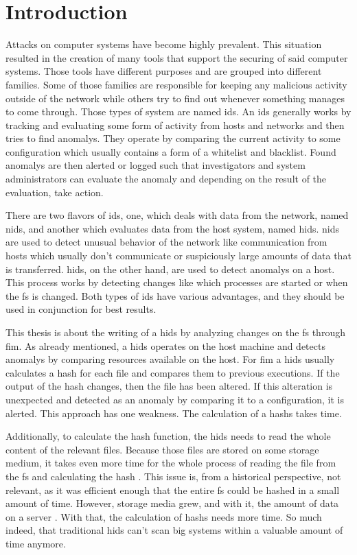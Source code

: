 \chapter{Introduction}

Attacks on computer systems have become highly prevalent. This situation resulted in the creation of many tools that support the securing of said computer systems. Those tools have different purposes and are grouped into different families. Some of those families are responsible for keeping any malicious activity outside of the network while others try to find out whenever something manages to come through. Those types of system are named \gls{ids}. An \gls{ids} generally works by tracking and evaluating some form of activity from hosts and networks and then tries to find \glspl{anomaly}. They operate by comparing the current activity to some configuration which usually contains a form of a whitelist and blacklist. Found \glspl{anomaly} are then alerted or logged such that investigators and system administrators can evaluate the \gls{anomaly} and depending on the result of the evaluation, take action. \cite{hidsnids}

There are two flavors of \gls{ids}, one, which deals with data from the network, named \gls{nids}, and another which evaluates data from the host system, named \gls{hids}. \gls{nids} are used to detect unusual behavior of the network like communication from hosts which usually don't communicate or suspiciously large amounts of data that is transferred. \gls{hids}, on the other hand, are used to detect \glspl{anomaly} on a host. This process works by detecting changes like which processes are started or when the \gls{fs} is changed. Both types of \gls{ids} have various advantages, and they should be used in conjunction for best results. \cite{hidsnids}

This thesis is about the writing of a \gls{hids} by analyzing changes on the \gls{fs} through \gls{fim}. As already mentioned, a \gls{hids} operates on the host machine and detects \glspl{anomaly} by comparing resources available on the host. For \gls{fim} a \gls{hids} usually calculates a \gls{hash} for each file and compares them to previous executions. If the output of the \gls{hash} changes, then the file has been altered. If this alteration is unexpected and detected as an \gls{anomaly} by comparing it to a configuration, it is alerted. This approach has one weakness. The calculation of a \glspl{hash} takes time.

Additionally, to calculate the hash function, the \gls{hids} needs to read the whole content of the relevant files. Because those files are stored on some storage medium, it takes even more time for the whole process of reading the file from the \gls{fs} and calculating the hash \cite{hash:slow, hash:speed}. This issue is, from a historical perspective, not relevant, as it was efficient enough that the entire \gls{fs} could be hashed in a small amount of time. However, storage media grew, and with it, the amount of data on a server \cite{bruce:imaging}. With that, the calculation of \glspl{hash} needs more time. So much indeed, that traditional \gls{hids} can't scan big systems within a valuable amount of time anymore.

